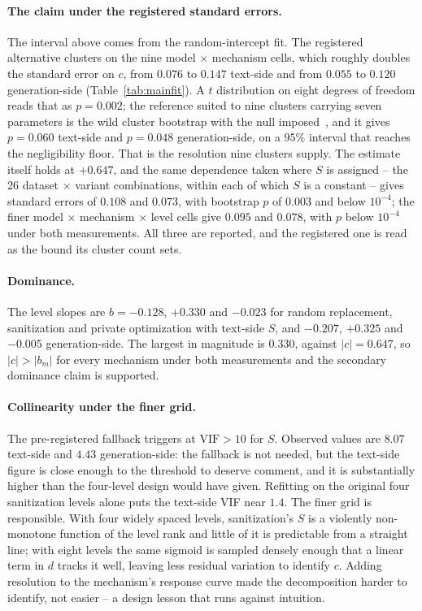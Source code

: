 \paragraph{The claim under the registered standard errors.}
The interval above comes from the random-intercept fit.
The registered alternative clusters on the nine model $\times$ mechanism cells,
which roughly doubles the standard error on $c$,
from $0.076$ to $0.147$ text-side and from $0.055$ to $0.120$ generation-side (Table~\ref{tab:mainfit}).
A $t$ distribution on eight degrees of freedom reads that as $p = 0.002$;
the reference suited to nine clusters carrying seven parameters is the wild cluster bootstrap with the null imposed~\citep{cameron2015practitioner},
and it gives $p = 0.060$ text-side and $p = 0.048$ generation-side,
on a $95\%$ interval that reaches the negligibility floor.
That is the resolution nine clusters supply.
The estimate itself holds at $+0.647$,
and the same dependence taken where $S$ is assigned -- the $26$ dataset $\times$ variant combinations,
within each of which $S$ is a constant -- gives standard errors of $0.108$ and $0.073$,
with bootstrap $p$ of $0.003$ and below $10^{-4}$;
the finer model $\times$ mechanism $\times$ level cells give $0.095$ and $0.078$,
with $p$ below $10^{-4}$ under both measurements.
All three are reported,
and the registered one is read as the bound its cluster count sets.

\paragraph{Dominance.}
The level slopes are $b = -0.128$,
$+0.330$ and $-0.023$ for random replacement,
sanitization and private optimization with text-side $S$,
and $-0.207$,
$+0.325$ and $-0.005$ generation-side.
The largest in magnitude is $0.330$,
against $|c| = 0.647$,
so $|c| > |b_m|$ for every mechanism under both measurements and the secondary dominance claim is supported.

\paragraph{Collinearity under the finer grid.}
The pre-registered fallback triggers at $\mathrm{VIF} > 10$ for $S$. Observed values are $8.07$ text-side and $4.43$ generation-side:
the fallback is not needed,
but the text-side figure is close enough to the threshold to deserve comment,
and it is substantially higher than the four-level design would have given.
Refitting on the original four sanitization levels alone puts the text-side VIF near $1.4$.
The finer grid is responsible.
With four widely spaced levels,
sanitization's $S$ is a violently non-monotone function of the level rank and little of it is predictable from a straight line;
with eight levels the same sigmoid is sampled densely enough that a linear term in $d$ tracks it well,
leaving less residual variation to identify $c$. Adding resolution to the mechanism's response curve made the decomposition harder to identify,
not easier -- a design lesson that runs against intuition.

